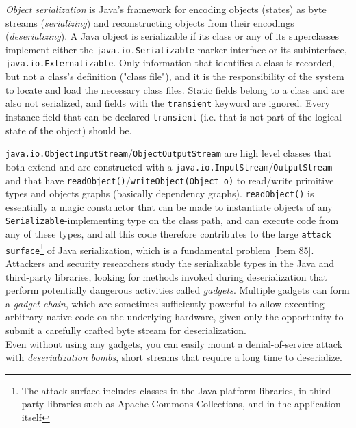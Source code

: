 \documentclass[table, xcdraw]{article}%
\begin{document}
\emph{Object serialization} is Java’s framework for encoding objects (states) as byte streams (\emph{serializing}) and reconstructing objects from their encodings (\emph{deserializing}). A Java object is serializable if its class or any of its superclasses implement either the \texttt{java.io.Serializable} marker interface or its subinterface, \texttt{java.io.Externalizable}. Only information that identifies a class is recorded, but not a class's definition ("class file"), and it is the responsibility of the system to locate and load the necessary class files. Static fields belong to a class and are also not serialized, and fields with the \texttt{transient} keyword are ignored. Every instance field that can be declared \texttt{transient} (i.e. that is not part of the logical state of the object) should be.

\texttt{java.io.ObjectInputStream}/\texttt{ObjectOutputStream} are high level classes that both extend and are constructed with a \texttt{java.io.InputStream}/\texttt{OutputStream} and that have \texttt{readObject()}/\texttt{writeObject(Object o)} to read/write primitive types and objects graphs (basically dependency graphs). \texttt{readObject()} is essentially a magic constructor that can be made to instantiate objects of any \texttt{Serializable}-implementing type on the class path, and can execute code from any of these types, and all this code therefore contributes to the large \texttt{attack surface}\footnote{The attack surface includes classes in the Java platform libraries, in third-party libraries such as Apache Commons Collections, and in the application itself} of Java serialization, which is a fundamental problem [Item 85].\\
Attackers and security researchers study the serializable types in the Java and third-party libraries, looking for methods invoked during deserialization that perform potentially dangerous activities called \emph{gadgets}. Multiple gadgets can form a \emph{gadget
chain}, which are sometimes sufficiently powerful to allow executing arbitrary native code on the underlying hardware,
given only the opportunity to submit a carefully crafted byte stream for deserialization.\\
Even without using any gadgets, you can easily mount a denial-of-service attack with \emph{deserialization bombs}, short streams that require a long time to deserialize.
\end{document}
